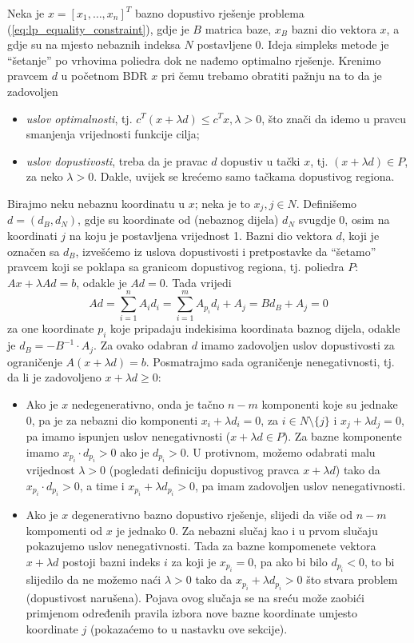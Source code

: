 \documentclass[a4paper, utf8, 11pt, colorlinks]{book}
\begin{document}
 Neka je $x = [x_1,\ldots, x_n]^T$ bazno dopustivo rješenje problema (\ref{eq:lp_equality_constraint}), gdje je $B$ matrica baze, $x_B$ bazni dio vektora $x$, a gdje su na mjesto nebaznih indeksa $N$ postavljene 0.  Ideja simpleks metode je  ``šetanje'' po vrhovima poliedra  dok ne nađemo optimalno rješenje. Krenimo pravcem $d$ u  početnom BDR $x$  pri čemu trebamo obratiti  pažnju na to da je zadovoljen
\begin{itemize}
    \item \emph{uslov optimalnosti}, tj. $c^T (x + \lambda d) \leq c^T x, \lambda>0$, što znači da idemo u pravcu smanjenja vrijednosti funkcije cilja;
    \item \emph{uslov dopustivosti}, treba da je pravac $d$ dopustiv u tački $x$, tj. $ (x + \lambda d) \in P$, za neko $\lambda>0$. Dakle, uvijek se krećemo samo tačkama dopustivog regiona. 
\end{itemize}
Birajmo neku nebaznu koordinatu u $x$; neka je to $x_j, j \in N$. Definišemo $d=(d_B,  d_N)$, gdje su koordinate od (nebaznog dijela) $d_N$ svugdje 0, osim na koordinati $j$ na koju je postavljena vrijednost 1.   Bazni dio vektora $d$, koji je označen sa $d_B$, izvešćemo iz uslova dopustivosti i pretpostavke da ``šetamo'' pravcem koji se poklapa sa granicom dopustivog regiona, tj. poliedra $P$: $Ax + \lambda Ad = b$, odakle je $Ad = 0$. Tada vrijedi
$$ Ad = \sum_{i=1}^n A_i d_i = \sum_{i=1}^m A_{p_i} d_i + A_j = B d_B + A_j = 0$$ za one koordinate $p_i$ koje pripadaju indekisima koordinata baznog dijela, 
odakle je $d_B = -  B^{-1} \cdot A_j $.  Za ovako odabran $d$ imamo zadovoljen uslov dopustivosti za ograničenje $A( x + \lambda d )  =b$. Posmatrajmo sada ograničenje nenegativnosti, tj. da li je zadovoljeno $x + \lambda d \geq 0$:
\begin{itemize}
    \item Ako je $x$ nedegenerativno, onda je tačno $n-m$ komponenti koje su jednake 0, pa je za nebazni dio komponenti $x_i + \lambda d_i = 0$, za $i \in N \setminus \{j\}$ i $x_j + \lambda d_j = 0$, pa imamo ispunjen uslov nenegativnosti ($x + \lambda d\in P$). Za bazne komponente imamo $x_{p_i} \cdot d_{p_i} > 0 $ ako je $d_{p_i}>0$. U protivnom, možemo odabrati  malu vrijednost  $\lambda>0$ (pogledati definiciju dopustivog pravca $x +\lambda d$) tako da $x_{p_i} \cdot d_{p_i} >0$, a time i $x_{p_i} + \lambda d_{p_i}>0$, pa imam zadovoljen uslov nenegativnosti.
    \item Ako je $x$ degenerativno bazno dopustivo rješenje, slijedi da više od $n-m$ kompomenti od $x$ je jednako 0. Za nebazni slučaj kao i u prvom slučaju pokazujemo uslov nenegativnosti. Tada za bazne kompomenete vektora $x +\lambda d$  postoji bazni indeks $i$ za koji je $x_{p_i} = 0$, pa ako bi bilo $d_{p_i}< 0$, to bi slijedilo da ne možemo naći $\lambda>0$ tako da $x_{p_i} + \lambda d_{p_i} >0$  što stvara problem (dopustivost narušena). Pojava ovog slučaja se na sreću može zaobići primjenom određenih pravila izbora nove bazne koordinate umjesto koordinate $j$ (pokazaćemo to u nastavku ove sekcije). 
\end{itemize}
\end{document}
